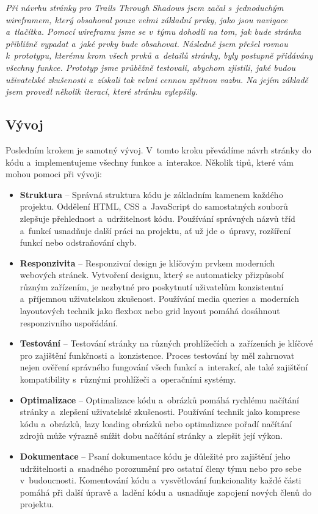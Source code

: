 \textit{Při návrhu stránky pro Trails Through Shadows jsem začal s~jednoduchým wireframem, který obsahoval pouze velmi základní prvky, jako jsou navigace a~tlačítka. Pomocí wireframu jsme se v~týmu dohodli na tom, jak bude stránka přibližně vypadat a~jaké prvky bude obsahovat. Následně jsem přešel rovnou k~prototypu, kterému krom všech prvků a~detailů stránky, byly postupně přidávány všechny funkce. Prototyp jsme průběžně testovali, abychom zjistili, jaké budou uživatelské zkušenosti a~získali tak velmi cennou zpětnou vazbu. Na jejím základě jsem provedl několik iterací, které stránku vylepšily.}

\subsection{Vývoj}
\label{subsec:development}

Posledním krokem je samotný vývoj. V~tomto kroku převádíme návrh stránky do kódu a~implementujeme všechny funkce a~interakce. Několik tipů, které vám mohou pomoci při vývoji:

\begin{itemize}
  \item \textbf{Struktura} -- Správná struktura kódu je základním kamenem každého projektu. Oddělení HTML, CSS a~JavaScript do samostatných souborů zlepšuje přehlednost a~udržitelnost kódu. Používání správných názvů tříd a~funkcí usnadňuje další práci na projektu, ať už jde o~úpravy, rozšíření funkcí nebo odstraňování chyb.
  \item \textbf{Responzivita} -- Responzivní design je klíčovým prvkem moderních webových stránek. Vytvoření designu, který se automaticky přizpůsobí různým zařízením, je nezbytné pro poskytnutí uživatelům konzistentní a~příjemnou uživatelskou zkušenost. Používání media queries a~moderních layoutových technik jako flexbox nebo grid layout pomáhá dosáhnout responzivního uspořádání.
  \item \textbf{Testování} -- Testování stránky na různých prohlížečích a~zařízeních je klíčové pro zajištění funkčnosti a~konzistence. Proces testování by měl zahrnovat nejen ověření správného fungování všech funkcí a~interakcí, ale také zajištění kompatibility s~různými prohlížeči a~operačními systémy.
  \item \textbf{Optimalizace} -- Optimalizace kódu a~obrázků pomáhá rychlému načítání stránky a~zlepšení uživatelské zkušenosti. Používání technik jako komprese kódu a~obrázků, lazy loading obrázků nebo optimalizace pořadí načítání zdrojů může výrazně snížit dobu načítání stránky a~zlepšit její výkon.
  \item \textbf{Dokumentace} --  Psaní dokumentace kódu je důležité pro zajištění jeho udržitelnosti a~snadného porozumění pro ostatní členy týmu nebo pro sebe v~budoucnosti. Komentování kódu a~vysvětlování funkcionality každé části pomáhá při další úpravě a~ladění kódu a~usnadňuje zapojení nových členů do projektu.
\end{itemize}

